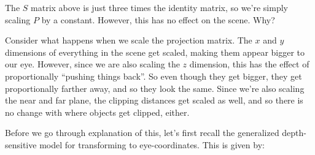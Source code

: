 \documentclass[11pt]{tingpset}
\begin{document}
    The $S$ matrix above is just three times the identity matrix, so we're simply scaling $P$ by a constant. However, this has no effect on the scene. Why?

    Consider what happens when we scale the projection matrix. The $x$ and $y$ dimensions of everything in the scene get scaled, making them appear bigger to our eye. However, since we are also scaling the $z$ dimension, this has the effect of proportionally ``pushing things back''. So even though they get bigger, they get proportionally farther away, and so they look the same. Since we're also scaling the near and far plane, the clipping distances get scaled as well, and so there is no change with where objects get clipped, either.

    Before we go through explanation of this, let's first recall the generalized depth-sensitive model for transforming to eye-coordinates. This is given by:
\end{document}
